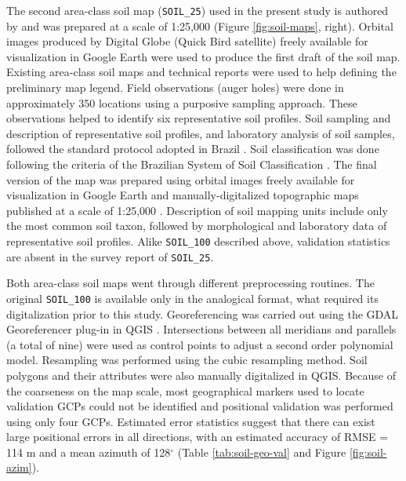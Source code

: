 The second area-class soil map (\texttt{SOIL\_25}) used in the present study is authored by \cite{Miguel2010} and was prepared at a scale of 1:25,000 (Figure \ref{fig:soil-maps}, right). Orbital images produced by Digital Globe\textregistered{} (Quick Bird satellite) freely available for visualization in Google Earth\textregistered{} were used to produce the first draft of the soil map. Existing area-class soil maps and technical reports \cite{Pedron2005, Poelking2007, Sturmer2008} were used to help defining the preliminary map legend. Field observations (auger holes) were done in approximately 350 locations using a purposive sampling approach. These observations helped to identify six representative soil profiles. Soil sampling and description of representative soil profiles, and laboratory analysis of soil samples, followed the standard protocol adopted in Brazil \cite{ClaessenEtAl1997, SantosEtAl2005}. Soil classification was done following the criteria of the Brazilian System of Soil Classification \cite{SantosEtAl2006}. The final version of the map was prepared using orbital images freely available for visualization in Google Earth\textregistered{} and manually-digitalized topographic maps published at a scale of 1:25,000 \cite{DSG1992a, DSG1992}. Description of soil mapping units include only the most common soil taxon, followed by morphological and laboratory data of representative soil profiles. Alike \texttt{SOIL\_100} described above, validation statistics are absent in the survey report of \texttt{SOIL\_25}.

Both area-class soil maps went through different preprocessing routines. The original \texttt{SOIL\_100} is available only in the analogical format, what required its digitalization prior to this study. Georeferencing was carried out using the GDAL Georeferencer plug-in in QGIS \cite{GDAL2013, QGIS2013}. Intersections between all meridians and parallels (a total of nine) were used as control points to adjust a second order polynomial model. Resampling was performed using the cubic resampling method. Soil polygons and their attributes were also manually digitalized in QGIS. Because of the coarseness on the map scale, most geographical markers used to locate validation GCPs could not be identified and positional validation was performed using only four GCPs. Estimated error statistics suggest that there can exist large positional errors in all directions, with an estimated accuracy of RMSE = 114 m and a mean azimuth of 128$^{\circ}$ (Table \ref{tab:soil-geo-val} and Figure \ref{fig:soil-azim}).

